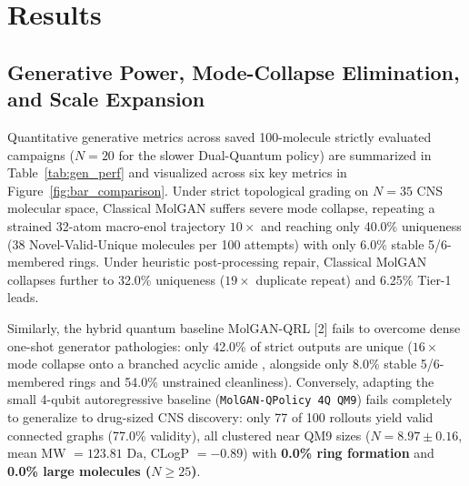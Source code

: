 \documentclass[10pt,a4paper]{article}
\begin{document}
\section{Results}

\subsection{Generative Power, Mode-Collapse Elimination, and Scale Expansion}
Quantitative generative metrics across saved 100-molecule strictly evaluated campaigns ($N=20$ for the slower Dual-Quantum policy) are summarized in Table~\ref{tab:gen_perf} and visualized across six key metrics in Figure~\ref{fig:bar_comparison}. Under strict topological grading on $N=35$ CNS molecular space, Classical MolGAN suffers severe mode collapse, repeating a strained 32-atom macro-enol trajectory $10\times$ and reaching only 40.0\% uniqueness (38 Novel-Valid-Unique molecules per 100 attempts) with only 6.0\% stable 5/6-membered rings. Under heuristic post-processing repair, Classical MolGAN collapses further to 32.0\% uniqueness ($19\times$ duplicate repeat) and 6.25\% Tier-1 leads.

Similarly, the hybrid quantum baseline MolGAN-QRL [2] fails to overcome dense one-shot generator pathologies: only 42.0\% of strict outputs are unique ($16\times$ mode collapse onto a branched acyclic amide \texttt{}, alongside only 8.0\% stable 5/6-membered rings and 54.0\% unstrained cleanliness). Conversely, adapting the small 4-qubit autoregressive baseline (\texttt{MolGAN-QPolicy 4Q QM9}) fails completely to generalize to drug-sized CNS discovery: only 77 of 100 rollouts yield valid connected graphs (77.0\% validity), all clustered near QM9 sizes ($N = 8.97 \pm 0.16$, mean MW $= 123.81\text{ Da}$, CLogP $= -0.89$) with \textbf{0.0\% ring formation} and \textbf{0.0\% large molecules ($N \ge 25$)}.
\end{document}
